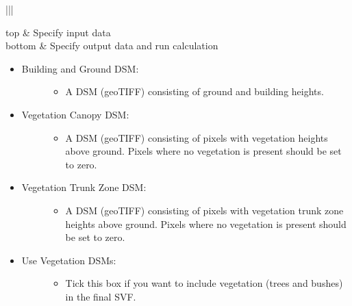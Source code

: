\documentclass[letterpaper,10pt,english]{sphinxmanual}
\begin{document}
\begin{savenotes}\sphinxattablestart
\centering
\begin{tabular}[t]{|||}
\hline

top
&
Specify input data
\\
\hline
bottom
&
Specify output data and run calculation
\\
\hline
\end{tabular}
\par
\sphinxattableend\end{savenotes}
\begin{itemize}
\item {} \begin{description}
\item[{Building and Ground DSM:}] \leavevmode\begin{itemize}
\item {} 
A DSM (geoTIFF) consisting of ground and building heights.

\end{itemize}

\end{description}

\item {} \begin{description}
\item[{Vegetation Canopy DSM:}] \leavevmode\begin{itemize}
\item {} 
A DSM (geoTIFF) consisting of pixels with vegetation heights above ground. Pixels where no vegetation is present should be set to zero.

\end{itemize}

\end{description}

\item {} \begin{description}
\item[{Vegetation Trunk Zone DSM:}] \leavevmode\begin{itemize}
\item {} 
A DSM (geoTIFF) consisting of pixels with vegetation trunk zone heights above ground. Pixels where no vegetation is present should be set to zero.

\end{itemize}

\end{description}

\item {} \begin{description}
\item[{Use Vegetation DSMs:}] \leavevmode\begin{itemize}
\item {} 
Tick this box if you want to include vegetation (trees and bushes) in the final SVF.


\end{itemize}
\end{description}
\end{itemize}
\end{document}
